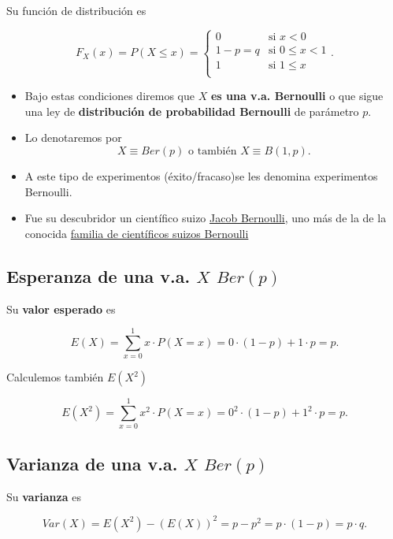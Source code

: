 \documentclass[]{book}
\providecommand{\tightlist}{%
  \setlength{\itemsep}{0pt}\setlength{\parskip}{0pt}}
\begin{document}
Su función de distribución es

\[
F_{X}(x)=P(X\leq x)=
\left\{
\begin{array}{ll} 
0 & \mbox{si } x<0\\
1-p=q & \mbox{si } 0\leq x <1\\
1 & \mbox{si } 1\leq x \\
\end{array}
\right..
\]

\begin{itemize}
\tightlist
\item
  Bajo estas condiciones diremos que \(X\) \textbf{es una v.a. Bernoulli} o que sigue una ley de \textbf{distribución de probabilidad Bernoulli} de parámetro \(p\).
\item
  Lo denotaremos por
  \[X\equiv Ber(p)\mbox{ o también } X\equiv B(1,p).\]
\item
  A este tipo de experimentos (éxito/fracaso)se les denomina experimentos Bernoulli.
\item
  Fue su descubridor un científico suizo \href{https://es.wikipedia.org/wiki/Jakob_Bernoulli}{Jacob Bernoulli}, uno más de la de la conocida \href{https://es.wikipedia.org/wiki/Familia_Bernoulli}{familia de científicos suizos Bernoulli}
\end{itemize}

\hypertarget{esperanza-de-una-v.a.-x-berp}{%
\subsection{\texorpdfstring{Esperanza de una v.a. \(X\) \(Ber(p)\)}{Esperanza de una v.a. X Ber(p)}}\label{esperanza-de-una-v.a.-x-berp}}

Su \textbf{valor esperado} es

\[E(X)=\displaystyle\sum_{x=0}^1 x\cdot P(X=x)= 0\cdot(1-p)+1\cdot p=p.\]

Calculemos también \(E(X^2)\)

\[E(X^2)=\displaystyle\sum_{x=0}^1 x^2\cdot P(X=x)= 0^2\cdot(1-p)+1^2\cdot p=p.\]

\hypertarget{varianza-de-una-v.a.-x-berp}{%
\subsection{\texorpdfstring{Varianza de una v.a. \(X\) \(Ber(p)\)}{Varianza de una v.a. X Ber(p)}}\label{varianza-de-una-v.a.-x-berp}}

Su \textbf{varianza} es

\[Var(X)=E(X^2)-\left(E(X)\right)^2=p-p^2=p\cdot (1-p)=p\cdot q.\]
\end{document}
